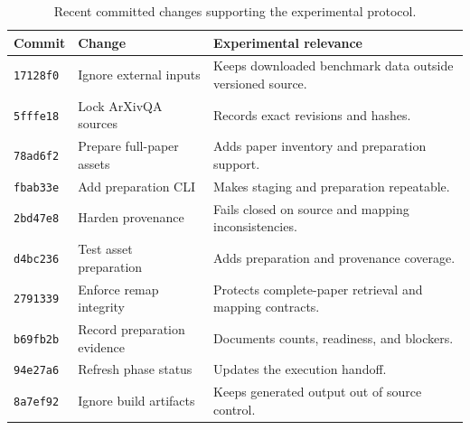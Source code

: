 \documentclass[10pt,twocolumn]{article}
\begin{document}
\begin{table}[H]
\centering
\caption{Recent committed changes supporting the experimental protocol.}
\small
\begin{tabular}{@{}llL{0.62\textwidth}@{}}
\toprule
Commit & Change & Experimental relevance \\
\midrule
\texttt{17128f0} & Ignore external inputs & Keeps downloaded benchmark data outside versioned source. \\
\texttt{5fffe18} & Lock ArXivQA sources & Records exact revisions and hashes. \\
\texttt{78ad6f2} & Prepare full-paper assets & Adds paper inventory and preparation support. \\
\texttt{fbab33e} & Add preparation CLI & Makes staging and preparation repeatable. \\
\texttt{2bd47e8} & Harden provenance & Fails closed on source and mapping inconsistencies. \\
\texttt{d4bc236} & Test asset preparation & Adds preparation and provenance coverage. \\
\texttt{2791339} & Enforce remap integrity & Protects complete-paper retrieval and mapping contracts. \\
\texttt{b69fb2b} & Record preparation evidence & Documents counts, readiness, and blockers. \\
\texttt{94e27a6} & Refresh phase status & Updates the execution handoff. \\
\texttt{8a7ef92} & Ignore build artifacts & Keeps generated output out of source control. \\
\bottomrule
\end{tabular}
\end{table}
\end{document}
